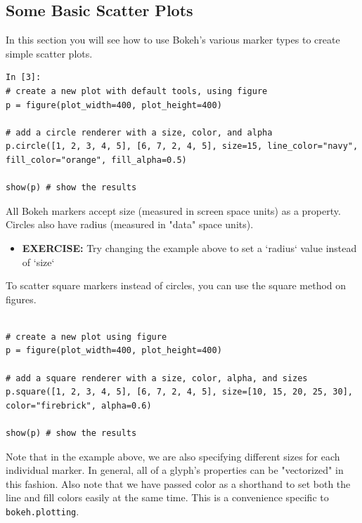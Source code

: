\documentclass[a4paper,12pt]{article}
\begin{document}
\subsection{Some Basic Scatter Plots}
In this section you will see how to use Bokeh's various marker types to create simple scatter plots.
\begin{framed}
	\begin{verbatim}
In [3]:
# create a new plot with default tools, using figure
p = figure(plot_width=400, plot_height=400)

# add a circle renderer with a size, color, and alpha
p.circle([1, 2, 3, 4, 5], [6, 7, 2, 4, 5], size=15, line_color="navy", fill_color="orange", fill_alpha=0.5)

show(p) # show the results
\end{verbatim}
\end{framed}
All Bokeh markers accept size (measured in screen space units) as a property. Circles also have radius (measured in "data" space units).


\begin{itemize}
\item \textbf{EXERCISE:} Try changing the example above to set a `radius` value instead of `size`
\end{itemize}


To scatter square markers instead of circles, you can use the square method on figures.


\begin{framed}
\begin{verbatim}

# create a new plot using figure
p = figure(plot_width=400, plot_height=400)

# add a square renderer with a size, color, alpha, and sizes
p.square([1, 2, 3, 4, 5], [6, 7, 2, 4, 5], size=[10, 15, 20, 25, 30], color="firebrick", alpha=0.6)

show(p) # show the results
\end{verbatim}
\end{framed}
Note that in the example above, we are also specifying different sizes for each individual marker. In general, all of a glyph's properties can be "vectorized" in this fashion. Also note that we have passed color as a shorthand to set both the line and fill colors easily at the same time. This is a convenience specific to \texttt{bokeh.plotting}.
\end{document}
